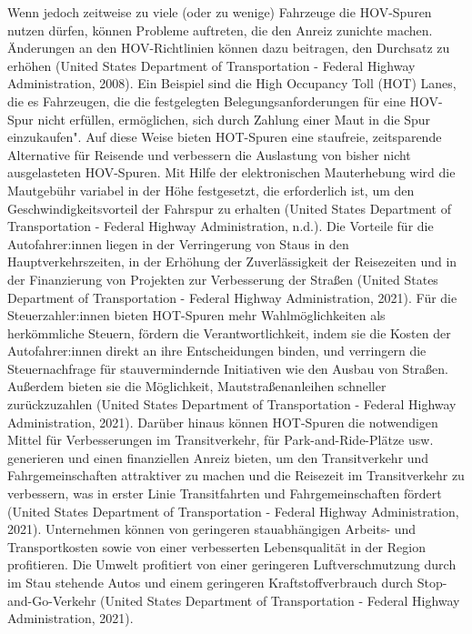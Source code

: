 \documentclass[
]{book}
\begin{document}
Wenn jedoch zeitweise zu viele (oder zu wenige) Fahrzeuge die HOV-Spuren nutzen dürfen, können Probleme auftreten, die den Anreiz zunichte machen. Änderungen an den HOV-Richtlinien können dazu beitragen, den Durchsatz zu erhöhen (United States Department of Transportation - Federal Highway Administration, 2008). Ein Beispiel sind die High Occupancy Toll (HOT) Lanes, die es Fahrzeugen, die die festgelegten Belegungsanforderungen für eine HOV-Spur nicht erfüllen, ermöglichen, sich durch Zahlung einer Maut in die Spur einzukaufen". Auf diese Weise bieten HOT-Spuren eine staufreie, zeitsparende Alternative für Reisende und verbessern die Auslastung von bisher nicht ausgelasteten HOV-Spuren. Mit Hilfe der elektronischen Mauterhebung wird die Mautgebühr variabel in der Höhe festgesetzt, die erforderlich ist, um den Geschwindigkeitsvorteil der Fahrspur zu erhalten (United States Department of Transportation - Federal Highway Administration, n.d.).
Die Vorteile für die Autofahrer:innen liegen in der Verringerung von Staus in den Hauptverkehrszeiten, in der Erhöhung der Zuverlässigkeit der Reisezeiten und in der Finanzierung von Projekten zur Verbesserung der Straßen (United States Department of Transportation - Federal Highway Administration, 2021).
Für die Steuerzahler:innen bieten HOT-Spuren mehr Wahlmöglichkeiten als herkömmliche Steuern, fördern die Verantwortlichkeit, indem sie die Kosten der Autofahrer:innen direkt an ihre Entscheidungen binden, und verringern die Steuernachfrage für stauvermindernde Initiativen wie den Ausbau von Straßen. Außerdem bieten sie die Möglichkeit, Mautstraßenanleihen schneller zurückzuzahlen (United States Department of Transportation - Federal Highway Administration, 2021).
Darüber hinaus können HOT-Spuren die notwendigen Mittel für Verbesserungen im Transitverkehr, für Park-and-Ride-Plätze usw. generieren und einen finanziellen Anreiz bieten, um den Transitverkehr und Fahrgemeinschaften attraktiver zu machen und die Reisezeit im Transitverkehr zu verbessern, was in erster Linie Transitfahrten und Fahrgemeinschaften fördert (United States Department of Transportation - Federal Highway Administration, 2021).
Unternehmen können von geringeren stauabhängigen Arbeits- und Transportkosten sowie von einer verbesserten Lebensqualität in der Region profitieren. Die Umwelt profitiert von einer geringeren Luftverschmutzung durch im Stau stehende Autos und einem geringeren Kraftstoffverbrauch durch Stop-and-Go-Verkehr (United States Department of Transportation - Federal Highway Administration, 2021).
\end{document}
